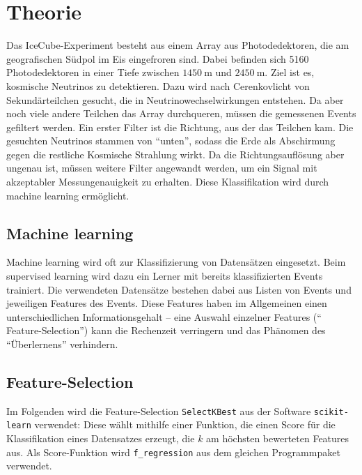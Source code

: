 \section{Theorie}
\label{sec:Theorie}
Das IceCube-Experiment besteht aus einem Array aus Photodedektoren, die am geografischen Südpol im Eis eingefroren sind. Dabei befinden sich 5160 Photodedektoren in einer Tiefe zwischen $\SI{1450}{\meter}$ und $\SI{2450}{\meter}$. Ziel ist es, kosmische Neutrinos zu detektieren. Dazu wird nach Cerenkovlicht von Sekundärteilchen gesucht, die in Neutrinowechselwirkungen entstehen. Da aber noch viele andere Teilchen das Array durchqueren, müssen die gemessenen Events gefiltert werden. Ein erster Filter ist die Richtung, aus der das Teilchen kam. Die gesuchten Neutrinos stammen von \enquote{unten}, sodass die Erde als Abschirmung gegen die restliche Kosmische Strahlung wirkt. Da die Richtungsauflösung aber ungenau ist, müssen weitere Filter angewandt werden, um ein Signal mit akzeptabler Messungenauigkeit zu erhalten. Diese Klassifikation wird durch machine learning ermöglicht. 

\subsection{Machine learning}
Machine learning wird oft zur Klassifizierung von Datensätzen eingesetzt. Beim supervised learning wird dazu ein Lerner mit bereits klassifizierten Events trainiert. Die verwendeten Datensätze bestehen dabei aus Listen von Events und jeweiligen Features des Events. Diese Features haben im Allgemeinen einen unterschiedlichen Informationsgehalt -- eine Auswahl einzelner Features (\enquote{ Feature-Selection}) kann die Rechenzeit verringern und das Phänomen des \enquote{Überlernens} verhindern.

\subsection{Feature-Selection}
\label{fs}
Im Folgenden wird die Feature-Selection \texttt{SelectKBest} aus der Software \texttt{scikit-learn} \cite{scikit} verwendet: Diese wählt mithilfe einer Funktion, die einen Score für die Klassifikation eines Datensatzes erzeugt, die $k$ am höchsten bewerteten Features aus. Als Score-Funktion wird \texttt{f\_regression} aus dem gleichen Programmpaket verwendet.

%
%

